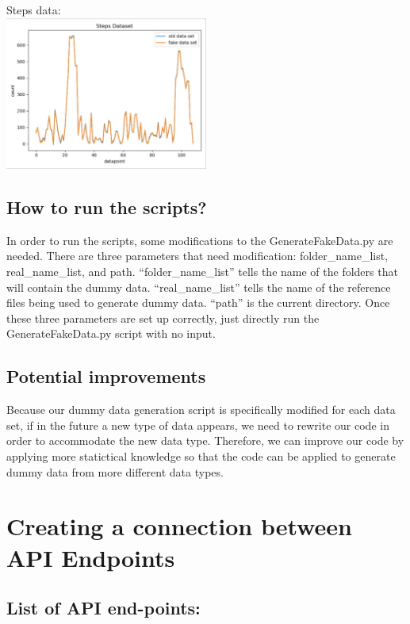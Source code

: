 \documentclass[]{book}
\begin{document}
Steps data:\\
\includegraphics[width=0.50000\textwidth]{./images/Steps Data.JPG}

\subsection{How to run the scripts?}\label{how-to-run-the-scripts}

In order to run the scripts, some modifications to the
GenerateFakeData.py are needed. There are three parameters that need
modification: folder\_name\_list, real\_name\_list, and path.
``folder\_name\_list'' tells the name of the folders that will contain
the dummy data. ``real\_name\_list'' tells the name of the reference
files being used to generate dummy data. ``path'' is the current
directory. Once these three parameters are set up correctly, just
directly run the GenerateFakeData.py script with no input.

\subsection{Potential improvements}\label{potential-improvements}

Because our dummy data generation script is specifically modified for
each data set, if in the future a new type of data appears, we need to
rewrite our code in order to accommodate the new data type. Therefore,
we can improve our code by applying more statictical knowledge so that
the code can be applied to generate dummy data from more different data
types.

\section{Creating a connection between API
Endpoints}\label{creating-a-connection-between-api-endpoints}

\subsection{List of API end-points:}\label{list-of-api-end-points}
\end{document}
